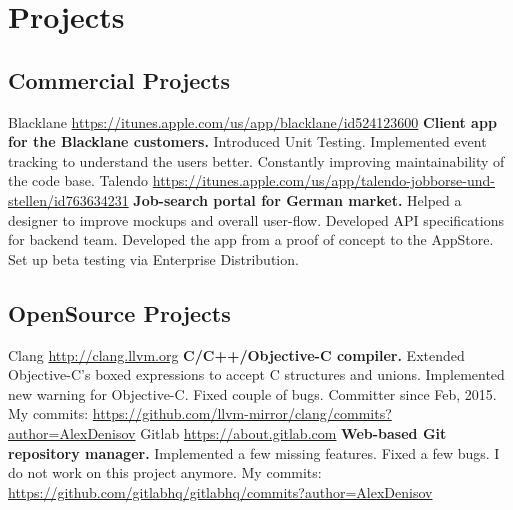 \documentclass[11pt,a4paper]{moderncv}
\begin{document}
\maketitle

\section{Projects}
  \subsection{Commercial Projects}
  \cvline
    {Blacklane}
    {\url{https://itunes.apple.com/us/app/blacklane/id524123600}\newline{}
    \textbf{Client app for the Blacklane customers.}\newline{}
    Introduced Unit Testing.\newline{}
    Implemented event tracking to understand the users better.\newline{}
    Constantly improving maintainability of the code base.}
  \cvline
    {Talendo}
    {\url{https://itunes.apple.com/us/app/talendo-jobborse-und-stellen/id763634231}\newline{}
    \textbf{Job-search portal for German market.}\newline{}
    Helped a designer to improve mockups and overall user-flow.\newline{}
    Developed API specifications for backend team.\newline{}
    Developed the app from a proof of concept to the AppStore.\newline{}
    Set up beta testing via Enterprise Distribution.}
  \subsection{OpenSource Projects}
  \cvline
    {Clang}
    {\url{http://clang.llvm.org}\newline{}
    \textbf{C/C++/Objective-C compiler.}\newline{}
    Extended Objective-C's boxed expressions to accept C structures and unions.\newline{}
    Implemented new warning for Objective-C.\newline{}
    Fixed couple of bugs.\newline{}
    Committer since Feb, 2015.\newline{}
    My commits:\newline{}
    \url{https://github.com/llvm-mirror/clang/commits?author=AlexDenisov}
    }
  \cvline
    {Gitlab}
    {\url{https://about.gitlab.com}\newline{}
    \textbf{Web-based Git repository manager.}\newline{}
    Implemented a few missing features.\newline{}
    Fixed a few bugs.\newline{}
    I do not work on this project anymore.\newline{}
    My commits:\newline{}
    \url{https://github.com/gitlabhq/gitlabhq/commits?author=AlexDenisov}
    }
\end{document}
